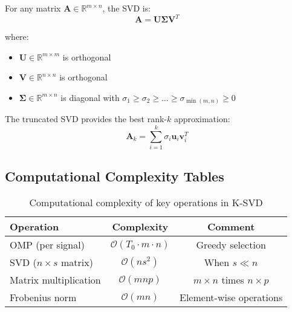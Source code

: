 \documentclass[12pt]{article}
\renewcommand{\vec}[1]{\mathbf{#1}}
\newcommand{\R}{\mathbb{R}}
\theoremstyle{definition}
\begin{document}
For any matrix $\mathbf{A} \in \R^{m \times n}$, the SVD is:
\begin{equation}
    \mathbf{A} = \mathbf{U}\mathbf{\Sigma}\mathbf{V}^T
\end{equation}

where:
\begin{itemize}
    \item $\mathbf{U} \in \R^{m \times m}$ is orthogonal
    \item $\mathbf{V} \in \R^{n \times n}$ is orthogonal
    \item $\mathbf{\Sigma} \in \R^{m \times n}$ is diagonal with $\sigma_1 \geq \sigma_2 \geq \ldots \geq \sigma_{\min(m,n)} \geq 0$
\end{itemize}

The truncated SVD provides the best rank-$k$ approximation:
\begin{equation}
    \mathbf{A}_k = \sum_{i=1}^k \sigma_i \vec{u}_i \vec{v}_i^T
\end{equation}

\subsection{Computational Complexity Tables}

\begin{table}[h]
    \centering
    \begin{tabular}{|l|c|c|}
        \hline
        \textbf{Operation}        & \textbf{Complexity}                & \textbf{Comment}                \\
        \hline
        OMP (per signal)          & $\mathcal{O}(T_0 \cdot m \cdot n)$ & Greedy selection                \\
        SVD ($n \times s$ matrix) & $\mathcal{O}(ns^2)$                & When $s \ll n$                  \\
        Matrix multiplication     & $\mathcal{O}(mnp)$                 & $m \times n$ times $n \times p$ \\
        Frobenius norm            & $\mathcal{O}(mn)$                  & Element-wise operations         \\
        \hline
    \end{tabular}
    \caption{Computational complexity of key operations in K-SVD}
\end{table}




\end{document}
